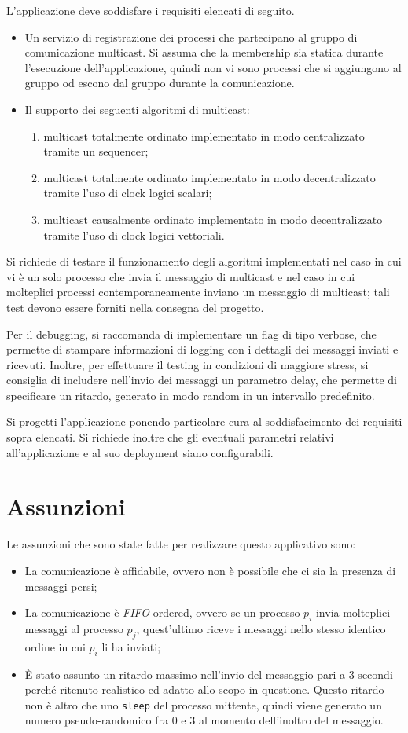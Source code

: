 \documentclass[acmtog]{acmart}
\begin{document}
L'applicazione deve soddisfare i requisiti elencati di seguito.
\begin{itemize}
\item Un servizio di registrazione dei processi che partecipano al gruppo di comunicazione multicast. Si assuma che la membership sia statica durante l'esecuzione dell'applicazione, quindi non vi sono processi che si aggiungono al gruppo od escono dal gruppo durante la comunicazione.
\item Il supporto dei seguenti algoritmi di multicast:
\begin{enumerate}
\item multicast totalmente ordinato implementato in modo centralizzato tramite un sequencer;
\item multicast totalmente ordinato implementato in modo decentralizzato tramite l’uso di clock logici scalari;
\item multicast causalmente ordinato implementato in modo decentralizzato tramite l’uso di clock logici vettoriali.
\end{enumerate}
\end{itemize}
Si richiede di testare il funzionamento degli algoritmi implementati nel caso in cui vi è un solo processo che invia il messaggio di multicast e nel caso in cui molteplici processi contemporaneamente inviano un messaggio di multicast; tali test devono essere forniti nella consegna del progetto.

Per il debugging, si raccomanda di implementare un flag di tipo verbose, che permette di stampare informazioni di logging con i dettagli dei messaggi inviati e ricevuti. Inoltre, per effettuare il testing in condizioni di maggiore stress, si consiglia di includere nell’invio dei messaggi un parametro delay, che permette di specificare un ritardo, generato in modo random in un intervallo predefinito.

Si progetti l'applicazione ponendo particolare cura al soddisfacimento dei requisiti sopra elencati. Si richiede inoltre che gli eventuali parametri relativi all'applicazione e al suo deployment siano configurabili.

\section{Assunzioni}
Le assunzioni che sono state fatte per realizzare questo applicativo sono:
\begin{itemize}
\item La comunicazione è affidabile, ovvero non è possibile che ci sia la presenza di messaggi persi;
\item La comunicazione è \textit{FIFO} ordered, ovvero se un processo $p_i$ invia molteplici messaggi al processo $p_j$, quest'ultimo riceve i messaggi nello stesso identico ordine in cui $p_i$ li ha inviati;
\item È stato assunto un ritardo massimo nell'invio del messaggio pari a $3$ secondi perché ritenuto realistico ed adatto allo scopo in questione. Questo ritardo non è altro che uno \texttt{sleep} del processo mittente, quindi viene generato un numero pseudo-randomico fra $0$ e $3$ al momento dell'inoltro del messaggio.
\end{itemize}
\end{document}
